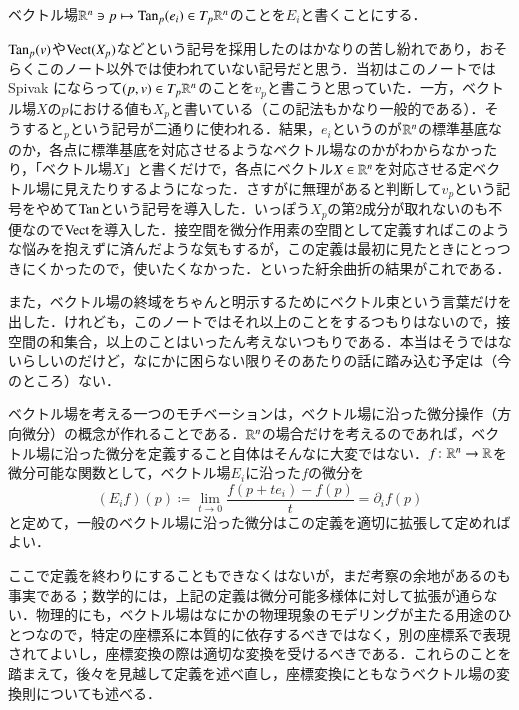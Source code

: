 \begin{defi}
ベクトル場$\mathbb{R}^n \ni p \mapsto \operatorname{Tan}_p(e_i) \in T_p \mathbb{R}^n$のことを$E_i$と書くことにする．
\end{defi}

\begin{dig}
$\operatorname{Tan}_p(v)$や$\operatorname{Vect}(X_p)$などという記号を採用したのはかなりの苦し紛れであり，おそらくこのノート以外では使われていない記号だと思う．当初はこのノートでは Spivak にならって$(p,v) \in T_p \mathbb{R}^n$のことを$v_p$と書こうと思っていた．一方，ベクトル場$X$の$p$における値も$X_p$と書いている（この記法もかなり一般的である）．そうすると$_p$という記号が二通りに使われる．結果，$e_i$というのが$\mathbb{R}^n$の標準基底なのか，各点に標準基底を対応させるようなベクトル場なのかがわからなかったり，「ベクトル場$X$」と書くだけで，各点にベクトル$X \in \mathbb{R}^n$を対応させる定ベクトル場に見えたりするようになった．さすがに無理があると判断して$v_p$という記号をやめて$\operatorname{Tan}$という記号を導入した．いっぽう$X_p$の第2成分が取れないのも不便なので$\operatorname{Vect}$を導入した．接空間を微分作用素の空間として定義すればこのような悩みを抱えずに済んだような気もするが，この定義は最初に見たときにとっつきにくかったので，使いたくなかった．といった紆余曲折の結果がこれである．

また，ベクトル場の終域をちゃんと明示するためにベクトル束という言葉だけを出した．けれども，このノートではそれ以上のことをするつもりはないので，接空間の和集合，以上のことはいったん考えないつもりである．本当はそうではないらしいのだけど，なにかに困らない限りそのあたりの話に踏み込む予定は（今のところ）ない．
\end{dig}

ベクトル場を考える一つのモチベーションは，ベクトル場に沿った微分操作（方向微分）の概念が作れることである．$\mathbb{R}^n$の場合だけを考えるのであれば，ベクトル場に沿った微分を定義すること自体はそんなに大変ではない．$f \colon \mathbb{R}^n \to \mathbb{R}$を微分可能な関数として，ベクトル場$E_i$に沿った$f$の微分を
\begin{equation}
(E_i f)(p) \coloneqq \lim_{t \to 0} \frac{f(p + t e_i) - f(p)}{t} = \partial_i f (p)
\end{equation}と定めて，一般のベクトル場に沿った微分はこの定義を適切に拡張して定めればよい．

ここで定義を終わりにすることもできなくはないが，まだ考察の余地があるのも事実である；数学的には，上記の定義は微分可能多様体に対して拡張が通らない．物理的にも，ベクトル場はなにかの物理現象のモデリングが主たる用途のひとつなので，特定の座標系に本質的に依存するべきではなく，別の座標系で表現されてよいし，座標変換の際は適切な変換を受けるべきである．これらのことを踏まえて，後々を見越して定義を述べ直し，座標変換にともなうベクトル場の変換則についても述べる．

